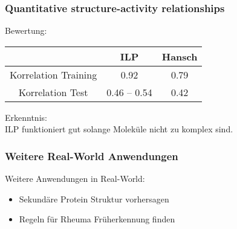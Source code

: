\begin{frame}
	\frametitle{Quantitative structure-activity relationships}
	Bewertung:
	\begin{center}
		\begin{tabular}{|c|c|c|}
			\hline
			& ILP & Hansch\\
			\hline
			Korrelation Training & 0.92 & 0.79\\
			\hline
			Korrelation Test     & 0.46 -- 0.54 & 0.42\\
			\hline
		\end{tabular}
	\end{center}
		Erkenntnis:\\
		ILP funktioniert gut solange Moleküle nicht zu komplex sind.
\end{frame}

\begin{frame}
	\frametitle{Weitere Real-World Anwendungen}
	Weitere Anwendungen in Real-World:
	\begin{itemize}
		\item Sekundäre Protein Struktur vorhersagen
		\item Regeln für Rheuma Früherkennung finden
	\end{itemize}
\end{frame}
